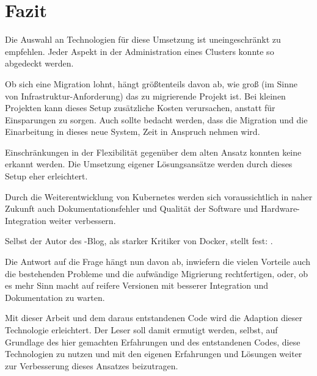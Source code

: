 \chapter{Fazit}
\label{cha:Fazit}

Die Auswahl an Technologien f\"ur diese Umsetzung ist uneingeschr\"ankt
zu empfehlen. Jeder Aspekt in der Administration eines Clusters
konnte so abgedeckt werden.

Ob sich eine Migration lohnt, h\"angt gr\"oßtenteils davon ab, wie
groß (im Sinne von Infrastruktur-Anforderung)
das zu migrierende Projekt ist. Bei kleinen Projekten kann
dieses Setup zus\"atzliche Kosten verursachen, anstatt f\"ur Einsparungen
zu sorgen. Auch sollte bedacht werden, dass die Migration und die Einarbeitung
in dieses neue System, Zeit in Anspruch nehmen wird.

Einschr\"ankungen in der
Flexibilit\"at gegen\"uber dem alten Ansatz konnten keine erkannt werden.
Die Umsetzung eigener L\"osungsans\"atze werden durch dieses Setup eher erleichtert.

Durch die Weiterentwicklung von Kubernetes werden sich voraussichtlich
in naher Zukunft auch Dokumentationsfehler und Qualit\"at der Software
und Hardware-Integration weiter verbessern.

Selbst der Autor des -Blog, als
starker Kritiker von Docker, stellt fest:
 \cite{hftguy}.

Die Antwort auf die Frage  h\"angt nun davon ab,
inwiefern die vielen Vorteile auch die bestehenden Probleme und die
aufw\"andige Migrierung rechtfertigen, oder,
ob es mehr Sinn macht auf reifere Versionen mit besserer Integration
und Dokumentation zu warten.

Mit dieser Arbeit und dem daraus entstandenen Code wird die Adaption
dieser Technologie erleichtert. Der Leser soll damit ermutigt werden, selbst,
auf Grundlage des hier gemachten Erfahrungen und des entstandenen Codes, diese
Technologien zu nutzen und mit den eigenen Erfahrungen und L\"osungen weiter zur
Verbesserung dieses Ansatzes beizutragen.
